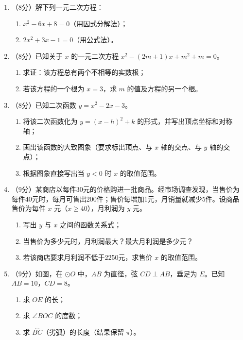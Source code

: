 \documentclass[12pt, a4paper]{ctexart}
\begin{document}
\begin{enumerate}[label=\arabic*., start=17]

\item （8分）解下列一元二次方程：
\begin{enumerate}[label=(\arabic*)]
\item $x^2 - 6x + 8 = 0$（用因式分解法）；
\item $2x^2 + 3x - 1 = 0$（用公式法）。
\end{enumerate}
\vspace{6cm}

\item （8分）已知关于 $x$ 的一元二次方程 $x^2 - (2m + 1)x + m^2 + m = 0$。
\begin{enumerate}[label=(\arabic*)]
\item 求证：该方程总有两个不相等的实数根；
\item 若该方程的一个根为 $x = 3$，求 $m$ 的值及方程的另一个根。
\end{enumerate}
\vspace{6cm}

\item （8分）已知二次函数 $y = x^2 - 2x - 3$。
\begin{enumerate}[label=(\arabic*)]
\item 将该二次函数化为 $y = (x - h)^2 + k$ 的形式，并写出顶点坐标和对称轴；
\item 画出该函数的大致图象（要求标出顶点、与 $x$ 轴的交点、与 $y$ 轴的交点）；
\item 根据图象直接写出当 $y < 0$ 时 $x$ 的取值范围。
\end{enumerate}
\vspace{6cm}

\item （9分）某商店以每件30元的价格购进一批商品。经市场调查发现，当售价为每件40元时，每月可售出200件；售价每增加1元，月销量就减少5件。设商品售价为每件 $x$ 元（$x \geqslant 40$），月利润为 $y$ 元。
\begin{enumerate}[label=(\arabic*)]
\item 写出 $y$ 与 $x$ 之间的函数关系式；
\item 当售价为多少元时，月利润最大？最大月利润是多少元？
\item 若该商店要求月利润不低于2250元，求售价 $x$ 的取值范围。
\end{enumerate}
\vspace{6cm}

\item （9分）如图，在 $\odot O$ 中，$AB$ 为直径，弦 $CD \perp AB$，垂足为 $E$。已知 $AB = 10$，$CD = 8$。
\begin{enumerate}[label=(\arabic*)]
\item 求 $OE$ 的长；
\item 求 $\angle BOC$ 的度数；
\item 求 $\overset{\frown}{BC}$（劣弧）的长度（结果保留 $\pi$）。
\end{enumerate}
\vspace{6cm}


\end{enumerate}
\end{document}
